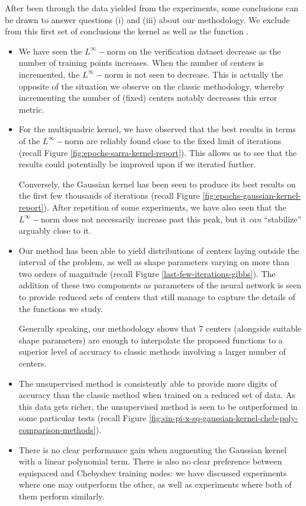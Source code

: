 \documentclass[12pt]{report} %
\newcommand{\tmem}[1]{{\em #1\/}}
\newcommand{\tmverbatim}[1]{\text{{\ttfamily{#1}}}}
\begin{document}
After been through the data yielded from the experiments, some conclusions can
be drawn to answer questions (i) and (iii) about our methodology. We exclude
from this first set of conclusions the kernel \tmverbatim{phs\_kernel} as well
as the function \tmverbatim{torch\_sign}.
\begin{itemize}
  \item We have seen the $L^{\infty} -$norm on the verification dataset
  decrease as the number of training points increases. When the number of
  centers is incremented, the $L^{\infty} -$norm is not seen to decrease. This
  is actually the opposite of the situation we observe on the classic
  methodology, whereby incrementing the number of (fixed) centers notably
  decreases this error metric.
  
  \item For the multiquadric kernel, we have observed that the best results
  in terms of the $L^{\infty} -$norm are reliably found close to the fixed
  limit of iterations (recall Figure \ref{fig:epochs-sarra-kernel-report}).
  This allows us to see that the results could potentially be improved upon if
  we iterated further.
  
  Conversely, the Gaussian kernel has been seen to produce its best results
  on the first few thousands of iterations (recall Figure
  \ref{fig:epochs-gaussian-kernel-report}). After repetition of some
  experiments, we have also seen that the $L^{\infty} -$norm does not
  necessarily increase past this peak, but it {\tmem{can}} ``stabilize''
  arguably close to it.
  
  \item Our method has been able to yield distributions of centers laying
  outside the interval of the problem, as well as shape parameters varying on
  more than two orders of magnitude (recall Figure
  \ref{last-few-iterations-gibbs}). The addition of these two components as
  parameters of the neural network is seen to provide reduced sets of centers
  that still manage to capture the details of the functions we study.
  
  Generally speaking, our methodology shows that 7 centers (alongside
  suitable shape parameters) are enough to interpolate the proposed functions
  to a superior level of accuracy to classic methods involving a larger number
  of centers.
  
  \item The unsupervised method is consistently able to provide more digits of
  accuracy than the classic method when trained on a reduced set of data.
  As this data gets richer, the unsupervised method is seen to be outperformed
  in some particular tests (recall Figure
  \ref{fig:sin-pi-x-sq-gaussian-kernel-cheb-poly-comparison-methods}).

  \item There is no clear performance gain when augmenting the Gaussian kernel with a linear polynomial term. There is also no clear preference between equispaced and Chebyshev training nodes: we have discussed experiments where one may outperform the other, as well as experiments where both of them perform similarly. 
\end{itemize}
\end{document}
